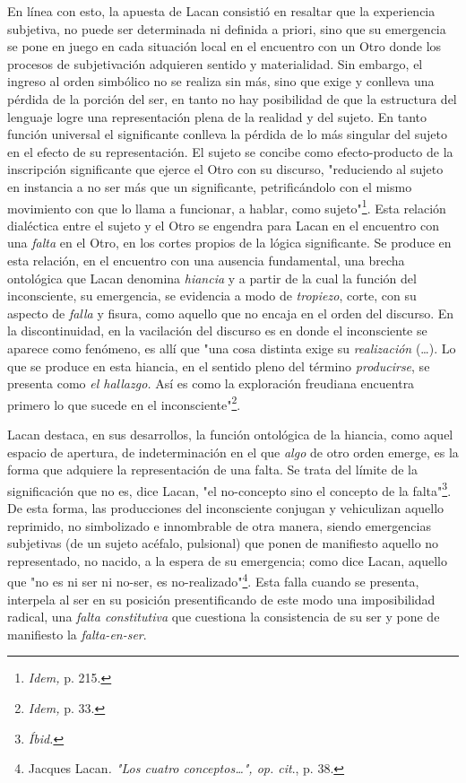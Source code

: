En línea con esto, la apuesta de Lacan consistió en resaltar que la
experiencia subjetiva, no puede ser determinada ni definida a priori,
sino que su emergencia se pone en juego en cada situación local en el
encuentro con un Otro donde los procesos de subjetivación adquieren
sentido y materialidad. Sin embargo, el ingreso al orden simbólico no se
realiza sin más, sino que exige y conlleva una pérdida de la porción del
ser, en tanto no hay posibilidad de que la estructura del lenguaje logre
una representación plena de la realidad y del sujeto. En tanto función
universal el significante conlleva la pérdida de lo más singular del
sujeto en el efecto de su representación. El sujeto se concibe como
efecto-producto de la inscripción significante que ejerce el Otro con su
discurso, "reduciendo al sujeto en instancia a no ser más que un
significante, petrificándolo con el mismo movimiento con que lo llama a
funcionar, a hablar, como sujeto"\footnote{\emph{Idem,} p. 215.}. Esta
relación dialéctica entre el sujeto y el Otro se engendra para Lacan en
el encuentro con una \emph{falta} en el Otro, en los cortes propios de
la lógica significante. Se produce en esta relación, en el encuentro con
una ausencia fundamental, una brecha ontológica que Lacan denomina
\emph{hiancia} y a partir de la cual la función del inconsciente, su
emergencia, se evidencia a modo de \emph{tropiezo}, corte, con su
aspecto de \emph{falla} y fisura, como aquello que no encaja en el orden
del discurso. En la discontinuidad, en la vacilación del discurso es en
donde el inconsciente se aparece como fenómeno, es allí que "una cosa
distinta exige su \emph{realización} (\dots). Lo que se produce en
esta hiancia, en el sentido pleno del término \emph{producirse}, se
presenta como \emph{el hallazgo.} Así es como la exploración freudiana
encuentra primero lo que sucede en el inconsciente"\footnote{\emph{Idem,}
  p. 33.}.

Lacan destaca, en sus desarrollos, la función ontológica de la hiancia,
como aquel espacio de apertura, de indeterminación en el que \emph{algo}
de otro orden emerge, es la forma que adquiere la representación de una
falta. Se trata del límite de la significación que no es, dice Lacan,
"el no-concepto sino el concepto de la falta"\footnote{\emph{Íbid.}}. De
esta forma, las producciones del inconsciente conjugan y vehiculizan
aquello reprimido, no simbolizado e innombrable de otra manera, siendo
emergencias subjetivas (de un sujeto acéfalo, pulsional) que ponen de
manifiesto aquello no representado, no nacido, a la espera de su
emergencia; como dice Lacan, aquello que "no es ni ser ni no-ser, es
no-realizado"\footnote{Jacques Lacan\emph{. "Los cuatro
  conceptos\ldots", op. cit}., p. 38.}. Esta falla cuando se presenta,
interpela al ser en su posición presentificando de este modo una
imposibilidad radical, una \emph{falta constitutiva} que cuestiona la
consistencia de su ser y pone de manifiesto la \emph{falta-en-ser}.

